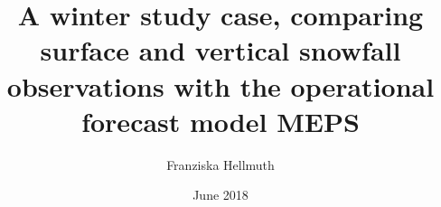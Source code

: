 \makeatletter
\title{A winter study case, comparing surface and vertical snowfall observations with the operational forecast model MEPS}	\let\Title\@title
\author{Franziska Hellmuth}	\let\Author\@author
\date{June 2018}		\let\Date\@date
\makeatother